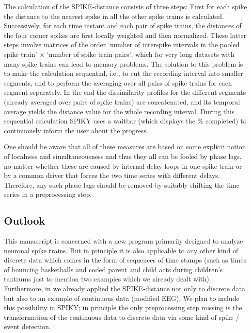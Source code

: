 \documentclass[10pt,twocolumn]{elsart5p}
\begin{document}
The calculation of the SPIKE-distance consists of three steps: First for each spike the distance to the nearest spike in all the other spike trains is calculated. Successively, for each time instant and each pair of spike trains, the distances of the four corner spikes are first locally weighted and then normalized. These latter steps involve matrices of the order `number of interspike intervals in the pooled spike train' $\times$ `number of spike train pairs', which for very long datasets with many spike trains can lead to memory problems. The solution to this problem is to make the calculation sequential, i.e., to cut the recording interval into smaller segments, and to perform the averaging over all pairs of spike trains for each segment separately. In the end the dissimilarity profiles for the different segments (already averaged over pairs of spike trains) are concatenated, and its temporal average yields the distance value for the whole recording interval. During this sequential calculation SPIKY uses a waitbar (which displays the \% completed) to continuously inform the user about the progress.

One should be aware that all of these measures are based on some explicit notion of localness and simultaneousness 
and thus they all can be fooled by phase lags, no matter whether these are caused by internal delay loops in one spike train or by a common driver that forces the two time series with different delays. Therefore, any such phase lags should be removed by suitably shifting the time series in a preprocessing step.



\subsection{\label{ss:Outlook} Outlook}


This manuscript is concerned with a new program primarily designed to analyze neuronal spike trains. But in principle it is also applicable to any other kind of discrete data which comes in the form of sequences of time stamps (such as times of bouncing basketballs and coded parent and child acts during children's tantrums just to mention two examples which we already dealt with). Furthermore, in \citet{Kreuz13} we already applied the SPIKE-distance not only to discrete data but also to an example of continuous data (modified EEG). We plan to include this possibility in SPIKY; in principle the only preprocessing step missing is the transformation of the continuous data to discrete data via some kind of spike / event detection.
\end{document}
